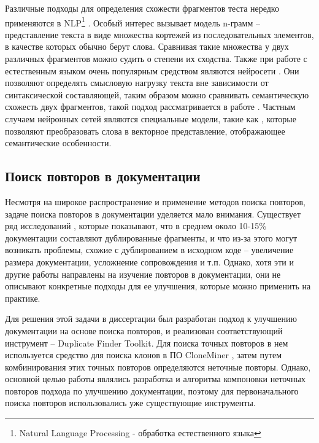 \documentclass[14pt]{matmex-diploma-custom}
\begin{document}
Различные подходы для определения схожести фрагментов теста нередко применяются в NLP\footnote{Natural Language Processing - обработка естественного языка} \cite{bib:art:NLP}. Особый интерес вызывает модель n-грамм \cite{bib:art:Ngram} -- представление текста в виде множества кортежей из последовательных элементов, в качестве которых обычно берут слова. Сравнивая такие множества у двух различных фрагментов можно судить о степени их сходства. Также при работе с естественным языком очень популярным средством являются нейросети \cite{bib:art:NeuralNetworks}. Они позволяют определять смысловую нагрузку текста вне зависимости от синтаксической составляющей, таким образом можно сравнивать семантическую схожесть двух фрагментов, такой подход рассматривается в работе \cite{bib:tool:NeuroDupDetect}. Частным случаем нейронных сетей являются специальные модели, такие как \cite{bib:tool:word2vec}, которые позволяют преобразовать слова в векторное представление, отображающее семантические особенности.

\subsection{Поиск повторов в документации}

Несмотря на широкое распространение и применение методов поиска повторов, задаче поиска повторов в документации уделяется мало внимания. Существует ряд исследований \cite{bib:art:JuergensCloneDetect, bib:art:DuplicatesStudy}, которые показывают, что в среднем около 10-15\% документации составляют дублированные фрагменты, и что из-за этого могут возникать проблемы, схожие с дублированием в исходном коде -- увеличение размера документации, усложнение сопровождения и т.п. Однако, хотя эти и другие работы направлены на изучение повторов в документации, они не описывают конкретные подходы для ее улучшения, которые можно применить на практике. 

Для решения этой задачи в диссертации \cite{bib:tool:DuplicateFinder} был разработан подход к улучшению документации  на основе поиска повторов, и реализован соответствующий инструмент -- Duplicate Finder Toolkit. Для поиска точных повторов в нем используется средство для поиска клонов в ПО CloneMiner \cite{bib:tool:CloneMiner}, затем путем комбинирования этих точных повторов определяются неточные повторы. Однако, основной целью работы являлись разработка и алгоритма компоновки неточных повторов подхода по улучшению документации, поэтому для первоначального поиска повторов использовались уже существующие инструменты.
\end{document}
